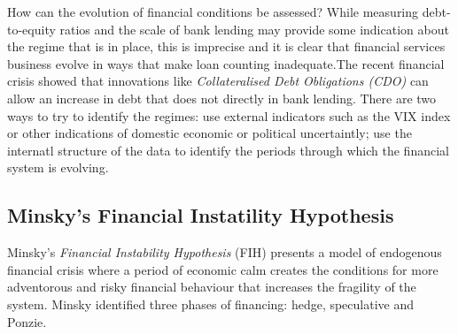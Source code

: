 \documentclass[12pt, a4paper, oneside]{article} %
\begin{document}


How can the evolution of financial conditions be assessed?  While measuring debt-to-equity ratios and the scale of bank lending may provide some indication about the regime that is in place, this is imprecise and it is clear that financial services business evolve in ways that make loan counting  inadequate.The recent financial crisis showed that innovations like \emph{Collateralised Debt Obligations (CDO)} can allow an increase in debt that does not directly in bank lending. There are two ways to try to identify the regimes: use external indicators such as the VIX index or other indications of domestic economic or political uncertaintly; use the internatl structure of the data to identify the periods through which the financial system  is evolving.  

\subsection{Minsky's Financial Instatility Hypothesis}
Minsky's \emph{Financial Instability Hypothesis} (FIH) presents a model of endogenous financial crisis where a period of economic calm creates the conditions for more adventorous and risky financial behaviour that increases the fragility of the system.  Minsky identified three phases of financing:  hedge, speculative and Ponzie.  
\end{document}
